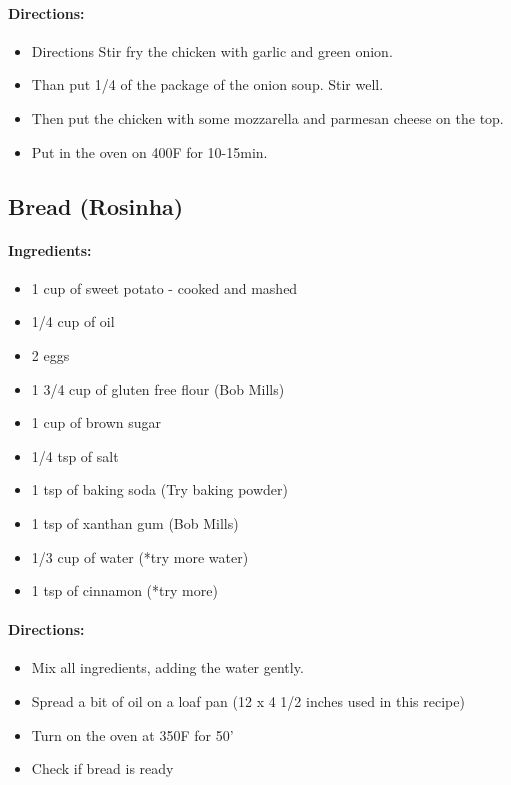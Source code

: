\documentclass{article}
\begin{document}
\paragraph{Directions:}
\begin{itemize}
	\item Directions Stir fry the chicken with garlic and green onion. 
	\item Than put 1/4 of the package of the onion soup. Stir well.
	\item Then put the chicken with some mozzarella and parmesan cheese on the top. 
	\item Put in the oven on 400F for 10-15min.
\end{itemize}

\subsection{Bread (Rosinha)}

\paragraph{Ingredients:}

\begin{itemize}
	\item 1 cup of sweet potato - cooked and mashed
	\item 1/4 cup of oil
	\item 2 eggs
	\item 1 3/4 cup of gluten free flour (Bob Mills)
	\item 1 cup of brown sugar 
	\item 1/4 tsp of salt
	\item 1 tsp of baking soda (Try baking powder)
	\item 1 tsp of xanthan gum (Bob Mills)
	\item 1/3 cup of water (*try more water)
	\item 1 tsp of cinnamon (*try more)
\end{itemize}

\paragraph{Directions:}
\begin{itemize}
	\item Mix all ingredients, adding the water gently.
	\item Spread a bit of oil on a loaf pan (12 x 4 1/2 inches used in this recipe)
	\item Turn on the oven at 350F for 50'
	\item Check if bread is ready
\end{itemize}
\end{document}
